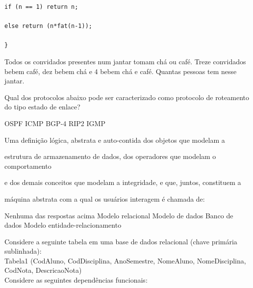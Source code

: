 \documentclass[12pt, addpoints]{exam}
\begin{document}
\begin{questions}
\begin{verbatim}
if (n == 1) return n; 

else return (n*fat(n-1)); 

} 

\end{verbatim}
\begin{choices}
\end{choices}

\question

Todos os convidados presentes num jantar tomam chá ou café. Treze convidados bebem café, dez bebem chá e 4 bebem chá e café. Quantas pessoas tem nesse jantar.


\begin{choices}
\end{choices}

\question

Qual dos protocolos abaixo pode ser caracterizado como protocolo de roteamento do tipo estado de enlace?
\begin{choices}
\choice OSPF
\choice ICMP
\choice BGP-4
\choice RIP2
\choice IGMP
\end{choices}

\question

Uma definição lógica, abstrata e auto-contida dos objetos que modelam a

estrutura de armazenamento de dados, dos operadores que modelam o comportamento

e dos demais conceitos que modelam a integridade, e que, juntos, constituem a

máquina abstrata com a qual os usuários interagem é chamada de:


\begin{choices}
\choice Nenhuma das respostas acima
\choice Modelo relacional
\choice Modelo de dados
\choice Banco de dados
\choice Modelo entidade-relacionamento
\end{choices}

\question

Considere a seguinte tabela em uma base de dados relacional (chave primária sublinhada):\\

Tabela1 (CodAluno, CodDisciplina, AnoSemestre, NomeAluno, NomeDisciplina, CodNota, DescricaoNota)\\

Considere as seguintes dependências funcionais:

\begin{itemize}


\end{itemize}
\end{questions}
\end{document}

